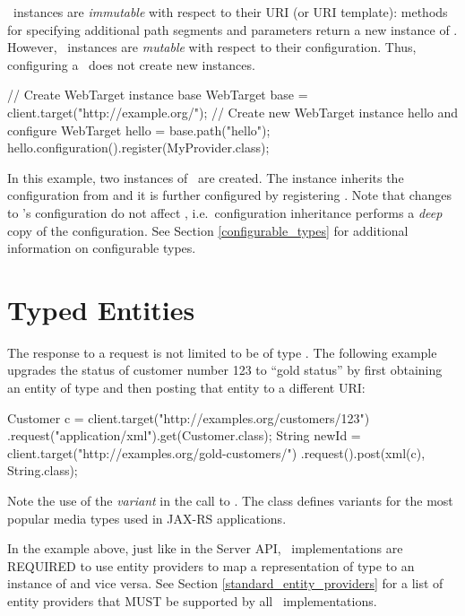 \WebTarget\ instances are {\em immutable} with respect to their URI (or URI template): methods for specifying additional path segments and parameters return a new instance of \WebTarget. However, \WebTarget\ instances are {\em mutable} with respect to their configuration. Thus, configuring a \WebTarget\ does not create new instances.

\begin{listing}{1}
// Create WebTarget instance base
WebTarget base = client.target("http://example.org/");
// Create new WebTarget instance hello and configure
WebTarget hello = base.path("hello");
hello.configuration().register(MyProvider.class);
\end{listing}

In this example, two instances of \WebTarget\ are created. The instance  inherits the configuration from  and it is further configured by registering . Note that changes to 's configuration do not affect , i.e.~configuration inheritance performs a {\em deep} copy of the configuration. See Section \ref{configurable_types} for additional information on configurable types.

\section{Typed Entities}

The response to a request is not limited to be of type \Response. The following example upgrades the status of customer number 123 to ``gold status'' by first obtaining an entity of type  and then posting that entity to a different URI:

\begin{listing}{1}
Customer c = client.target("http://examples.org/customers/123")
    .request("application/xml").get(Customer.class);
String newId = client.target("http://examples.org/gold-customers/")
    .request().post(xml(c), String.class);
\end{listing}

Note the use of the {\em variant}  in the call to . The class  defines variants for the most popular media types used in JAX-RS applications.

In the example above, just like in the Server API, \jaxrs\ implementations are REQUIRED to use entity providers to map a representation of type  to an instance of  and vice versa. See Section \ref{standard_entity_providers} for a list of entity providers that MUST be supported by all \jaxrs\ implementations.

